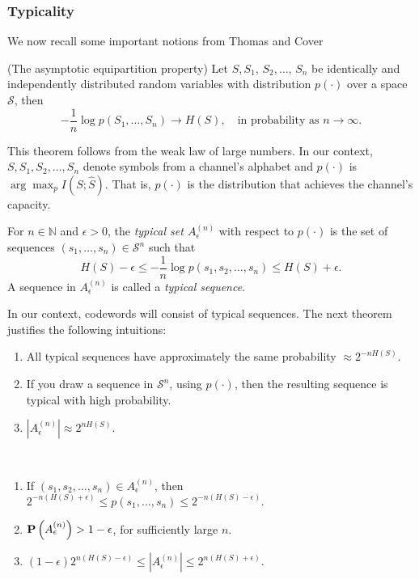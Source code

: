 \subsubsection*{Typicality}

We now recall some important notions from Thomas and Cover~\cite{infotheory}

\begin{theorem}{(The asymptotic equipartition property)} Let $S, S_1$, $S_2, \ldots$, $S_n$ be identically and independently distributed random variables with distribution $p(\cdot)$ over a space $\mathcal{S}$, then
%
$$-\frac{1}{n} \log p(S_1, \ldots, S_n) \to H(S), \quad \text{in probability as } n \to \infty.$$
%
\end{theorem}

This theorem follows from the weak law of large numbers. In our context, $S, S_1, S_2, \ldots, S_n$ denote symbols from a channel's alphabet and $p(\cdot)$ is $\arg\max_p I(S; \hat{S})$. That is, $p(\cdot)$ is the distribution that achieves the channel's capacity.

\begin{definition}
For $n \in \mathbb{N}$ and $\epsilon > 0$, the \emph{typical set $A^{(n)}_\epsilon$} with respect to $p(\cdot)$ is the set of sequences $(s_1, \dots, s_n) \in \mathcal{S}^n$ such that
%
$$H(S) - \epsilon \leq -\frac{1}{n}\log p(s_1, s_2, \ldots, s_n) \leq H(S) + \epsilon.$$
%
A sequence in $A^{(n)}_\epsilon$ is called a \emph{typical sequence}.
\end{definition}

In our context, codewords will consist of typical sequences.
The next theorem justifies the following intuitions:

\begin{enumerate}
\item All typical sequences have approximately the same probability $\approx 2^{-nH(S)}$.
\item If you draw a sequence in $\mathcal{S}^n$, using $p(\cdot)$, then the resulting sequence is typical with high probability.
\item $\left|A^{(n)}_\epsilon\right| \approx 2^{nH(S)}$.
\end{enumerate}

\begin{theorem}\mbox{   }
\begin{enumerate}
\item If $\left(s_1, s_2, \ldots, s_n\right) \in A^{(n)}_\epsilon$, then $2^{-n\left(H(S) + \epsilon\right)} \leq p(s_1, \ldots, s_n) \leq 2^{-n\left(H(S) - \epsilon\right)}.$
\item $\mathbf{P}\left(A^{(n)}_\epsilon\right) > 1 - \epsilon$, for sufficiently large $n$.
\item $(1 - \epsilon)2^{n\left(H(S) - \epsilon\right)} \leq \left|A^{(n)}_\epsilon\right| \leq 2^{n\left(H(S) + \epsilon\right)}$.
\end{enumerate}
\end{theorem}

